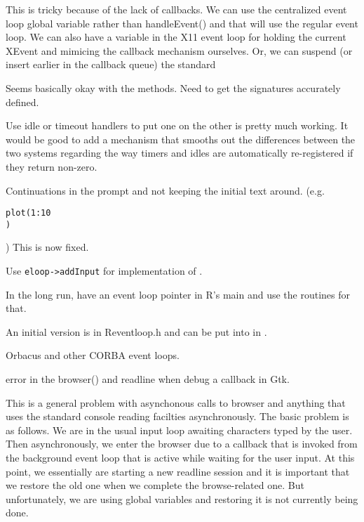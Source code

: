 \documentclass{article}
\begin{document}
\begin{description}
\item[X11 device locator.]  This is tricky because of the lack of
  callbacks.  We can use the centralized event loop global variable
  rather than handleEvent() and that will use the regular event loop.
  We can also have a variable in the X11 event loop for 
  holding the current XEvent and mimicing the callback mechanism
  ourselves.
  Or, we can suspend (or insert earlier in the callback queue) the 
  standard 

\item[Tcl/Tk event loop integration.]
Seems basically okay  with the methods.
Need to get the signatures accurately defined.

\item[Mixing tcl and GTk.]

  Use idle or timeout handlers to put one on the other is pretty much
  working.  It would be good to add a mechanism that smooths out the
  differences between the two systems regarding the way timers and
  idles are automatically re-registered if they return non-zero.

\item Continuations in the prompt and not keeping the initial text around.
(e.g.
\begin{verbatim}
plot(1:10
)
\end{verbatim}
)
This is now fixed.

\item[Merge with existing R code.]

Use \verb+eloop->addInput+ for implementation of
.

In the long run, have an event loop pointer in R's
main and use the routines for that.

\item[Generic event loop structure] An initial version is in
  Reventloop.h and can be put into  in
  .


\item[] Orbacus and other CORBA event loops.

\item[] error in the browser() and readline 
when debug a callback in Gtk.

This is a general problem with asynchonous calls to browser and
anything that uses the standard console reading facilties
asynchronously.  The basic problem is as follows.  We are in the usual
input loop awaiting characters typed by the user.  Then
asynchronously, we enter the browser due to a callback that is invoked
from the background event loop that is active while waiting for the
user input.  At this point, we essentially are starting a new readline
session and it is important that we restore the old one when we
complete the browse-related one. But unfortunately, we are using
global variables and restoring it is not currently being done.


\end{description}
\end{document}
